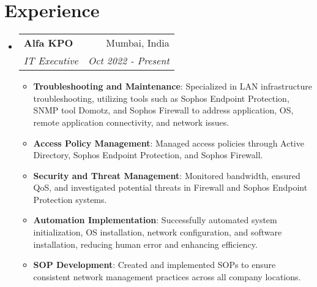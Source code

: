 \documentclass[letterpaper,11pt]{article}
\makeatletter
\newcommand{\resumeItem}[2]{
  \item\small{
    \textbf{#1}{: #2 \vspace{-2pt}}
  }
}
\newcommand{\resumeSubheading}[4]{
  \vspace{-1pt}\item
    \begin{tabular*}{0.97\textwidth}[t]{l@{\extracolsep{\fill}}r}
      \textbf{#1} & #2 \\
      \textit{\small#3} & \textit{\small #4} \\
    \end{tabular*}\vspace{-5pt}
}
\newcommand{\resumeSubHeadingListStart}{\begin{itemize}[leftmargin=*]}
\newcommand{\resumeSubHeadingListEnd}{\end{itemize}}
\newcommand{\resumeItemListStart}{\begin{itemize}}
\newcommand{\resumeItemListEnd}{\end{itemize}\vspace{-5pt}}
\makeatother
\begin{document}
\section{Experience}
  \resumeSubHeadingListStart

    \resumeSubheading
      {Alfa KPO}{Mumbai, India}
      {IT Executive}{Oct 2022 - Present}
      \resumeItemListStart
        \resumeItem{Troubleshooting and Maintenance}
          {Specialized in LAN infrastructure troubleshooting, utilizing tools such as Sophos Endpoint Protection, SNMP tool Domotz, and Sophos Firewall to address application, OS, remote application connectivity, and network issues.}
        \resumeItem{Access Policy Management}
          {Managed access policies through Active Directory, Sophos Endpoint Protection, and Sophos Firewall.}
        \resumeItem{Security and Threat Management}
          {Monitored bandwidth, ensured QoS, and investigated potential threats in Firewall and Sophos Endpoint Protection systems.}
        \resumeItem{Automation Implementation}
          {Successfully automated system initialization, OS installation, network configuration, and software installation, reducing human error and enhancing efficiency.}
        \resumeItem{SOP Development}
          {Created and implemented SOPs to ensure consistent network management practices across all company locations.}



      \resumeItemListEnd

  \resumeSubHeadingListEnd




\end{document}
